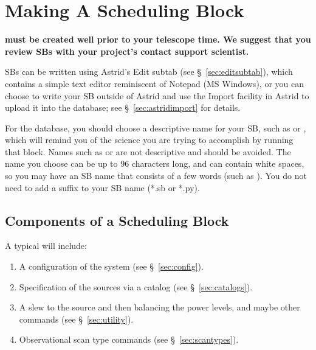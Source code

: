 \newpage





\section{Making A Scheduling Block}

{\bf {} must be created well prior to your telescope time. 
We suggest that you review \glspl{SB} with your project's contact support scientist.}

\glspl{SB} can be written using \gls{Astrid}'s  Edit subtab
(see \S~\ref{sec:editsubtab}), which contains a simple text editor reminiscent of Notepad
(MS Windows), or you can choose to write your \gls{SB} outside of \gls{Astrid} and use the
 Import facility in \gls{Astrid} to upload it into the database;
see \S~\ref{sec:astridimport} for details.

For the database, you should choose a descriptive name for your \gls{SB}, such as 
or , which will remind you of the science you are trying to accomplish by running
that block. Names such as  or  are not descriptive and should be avoided.
The name you choose can be up to 96 characters long, and can contain white spaces, so you may
have an \gls{SB} name that consists of a few words (such as ). You do not need to add a suffix to your \gls{SB} name (*.sb or *.py).


\subsection{Components of a Scheduling Block}

A typical  will include:
\begin{enumerate}[label=\Alph*),itemsep=0pt]
\item A configuration of the system (see \S~\ref{sec:config}).
\item Specification of the sources via a catalog (see \S~\ref{sec:catalogs}).
\item A slew to the source and then balancing the power levels, and maybe other commands
(see \S~\ref{sec:utility}).
\item Observational scan type commands (see \S~\ref{sec:scantypes}).
\end{enumerate}


